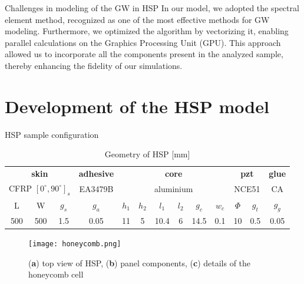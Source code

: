\documentclass[10pt,aspectratio=169]{beamer} %
\begin{document}
\begin{frame}[label=frame5]{Challenges in modeling of the GW in HSP}
{	In our model, we adopted the spectral element method, recognized as one of the most effective methods for GW modeling. Furthermore, we optimized the algorithm by vectorizing it, enabling parallel calculations on the Graphics Processing Unit (GPU). This approach allowed us to incorporate all the components present in the analyzed sample, thereby enhancing the fidelity of our simulations.}
\end{frame}
\section{Development of the HSP model}
\begin{frame}[label=frame7]{HSP sample configuration}
\begin{table}
	\centering \scriptsize
	\caption{Geometry of HSP [mm]}
	\begin{tabular}{ccccccccccccc} 
		\toprule
		\multicolumn{3}{c}{\textbf{skin}} & {\textbf{adhesive}} & \multicolumn{6}{c}{\textbf{core}} & \multicolumn{2}{c}{\textbf{pzt}} & {\textbf{glue}}\\
		\multicolumn{3}{c}{CFRP $[0^\circ,90^\circ]_s$} & {EA3479B} & \multicolumn{6}{c}{aluminium} & \multicolumn{2}{c}{NCE51} & {CA}\\ 
		\cmidrule(lr){1-3} \cmidrule(lr){4-4} \cmidrule(lr){5-10} \cmidrule(lr){11-12} \cmidrule(lr){13-13}
		L & W & $g_s$ & $g_a$ & $h_1$ & $h_2$ & $l_1$ & $l_2$ & $g_c$ & $w_c$ & $\Phi$ & $g_t$ & $g_g$\\ 
		\cmidrule(lr){1-3} \cmidrule(lr){4-4} \cmidrule(lr){5-10} \cmidrule(lr){11-12} \cmidrule(lr){13-13}
		500 & 500 & 1.5 & 0.05 & 11 & 5 & 10.4 & 6 & 14.5 & 0.1 & 10 & 0.5 & 0.05\\
		\bottomrule 
	\end{tabular} 
	\label{tab:panel_geo}
\end{table}
	\begin{figure}
	\texttt{[image: honeycomb.png]}
	\caption{(\textbf{a}) top view of HSP, (\textbf{b}) panel components, (\textbf{c}) details of the honeycomb cell}
	\end{figure}
\end{frame}
\end{document}
